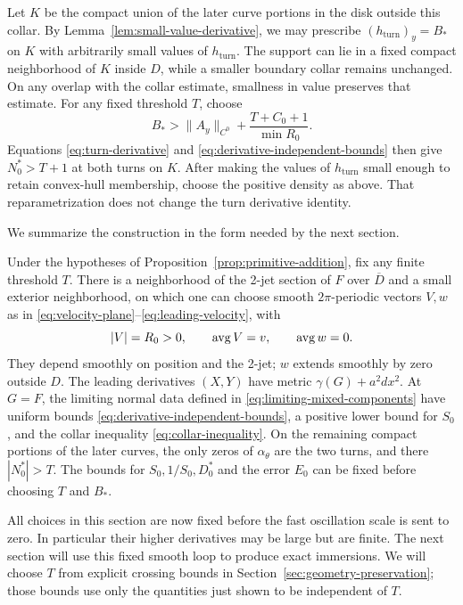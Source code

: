 Let $K$ be the compact union of the later curve portions in the disk
outside this collar.  By Lemma~\ref{lem:small-value-derivative},
we may prescribe $(h_{\mathrm{turn}})_y=B_*$ on $K$ with arbitrarily
small values of $h_{\mathrm{turn}}$.  The support can lie in a fixed compact neighborhood of $K$ inside $D$,
while a smaller boundary collar remains unchanged.  On any overlap
with the collar estimate, smallness in value preserves that estimate.
For any fixed threshold $T$, choose
\begin{equation}
 B_* > \|A_y\|_{C^0}
        +\frac{T+C_0+1}{\min R_0}.
 \label{eq:turn-size-choice}
\end{equation}
Equations \eqref{eq:turn-derivative} and
\eqref{eq:derivative-independent-bounds} then give
$N_0^*>T+1$ at both turns on $K$.  After making the values of
$h_{\mathrm{turn}}$ small enough to retain convex-hull membership,
choose the positive density as above.  That reparametrization does not
change the turn derivative identity.

We summarize the construction in the form needed by the next section.

\begin{lemma}
\label{lem:velocity-loop}
Under the hypotheses of Proposition~\ref{prop:primitive-addition}, fix
any finite threshold $T$.  There is a neighborhood of the 2-jet section
of $F$ over $\overline D$ and a small exterior neighborhood, on which
one can choose smooth $2\pi$-periodic vectors $V,w$ as in
\eqref{eq:velocity-plane}--\eqref{eq:leading-velocity}, with
\[
 |V|=R_0>0,\qquad \operatorname{avg} V=v,\qquad \operatorname{avg} w=0.
\]
They depend smoothly on position and the 2-jet; $w$ extends smoothly by
zero outside $D$.  The leading derivatives $(X,Y)$ have metric
$\gamma(G)+a^2dx^2$.  At $G=F$, the limiting normal data defined in
\eqref{eq:limiting-mixed-components} have uniform bounds
\eqref{eq:derivative-independent-bounds}, a positive lower bound for
$S_0$, and the collar inequality \eqref{eq:collar-inequality}.
On the remaining compact portions of the later curves, the only zeros
of $\alpha_\theta$ are the two turns, and there $|N_0^*|>T$.
The bounds for $S_0,1/S_0,D_0^*$ and the error $E_0$ can be fixed before
choosing $T$ and $B_*$.
\end{lemma}

All choices in this section are now fixed before the fast oscillation
scale is sent to zero.  In particular their higher derivatives may be
large but are finite.  The next section will use this fixed smooth
loop to produce exact immersions.  We will choose $T$ from explicit
crossing bounds in Section~\ref{sec:geometry-preservation}; those bounds
use only the quantities just shown to be independent of $T$.
